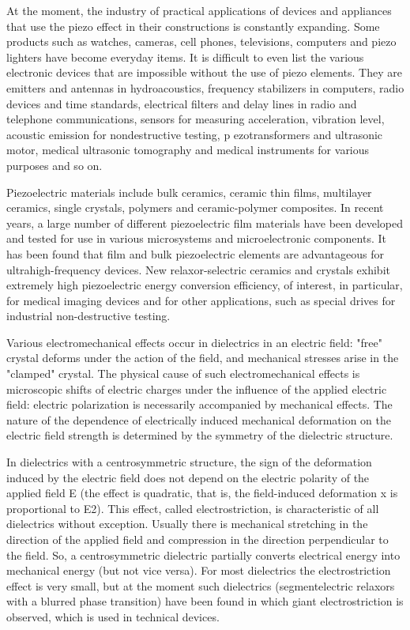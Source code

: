 \documentclass[a4paper,14pt]{extreport}
\begin{document}
At the moment, the industry of practical applications of devices and appliances that use the piezo effect in their constructions is constantly expanding. Some products such as watches, cameras, cell phones, televisions, computers and piezo lighters have become everyday items. It is difficult to even list the various electronic devices that are impossible without the use of piezo elements. They are emitters and antennas in hydroacoustics, frequency stabilizers in computers, radio devices and time standards, electrical filters and delay lines in radio and telephone communications, sensors for measuring acceleration, vibration level, acoustic emission for nondestructive testing, p  ezotransformers and ultrasonic motor, medical ultrasonic tomography and medical instruments for various purposes and so on.\par
Piezoelectric materials include bulk ceramics, ceramic thin films, multilayer ceramics, single crystals, polymers and ceramic-polymer composites. In recent years, a large number of different piezoelectric film materials have been developed and tested for use in various microsystems and microelectronic components. It has been found that film and bulk piezoelectric elements are advantageous for ultrahigh-frequency devices. New relaxor-selectric ceramics and crystals exhibit extremely high piezoelectric energy conversion efficiency, of interest, in particular, for medical imaging devices and for other applications, such as special drives for industrial non-destructive testing.\par
Various electromechanical effects occur in dielectrics in an electric field: "free" crystal deforms under the action of the field, and mechanical stresses arise in the "clamped" crystal. The physical cause of such electromechanical effects is microscopic shifts of electric charges under the influence of the applied electric field: electric polarization is necessarily accompanied by mechanical effects. The nature of the dependence of electrically induced mechanical deformation on the electric field strength is determined by the symmetry of the dielectric structure.\par
In dielectrics with a centrosymmetric structure, the sign of the deformation induced by the electric field does not depend on the electric polarity of the applied field E (the effect is quadratic, that is, the field-induced deformation x is proportional to E2). This effect, called electrostriction, is characteristic of all dielectrics without exception. Usually there is mechanical stretching in the direction of the applied field and compression in the direction perpendicular to the field. So, a centrosymmetric dielectric partially converts electrical energy into mechanical energy (but not vice versa). For most dielectrics the electrostriction effect is very small, but at the moment such dielectrics (segmentelectric relaxors with a blurred phase transition) have been found in which giant electrostriction is observed, which is used in technical devices.\par
\end{document}
